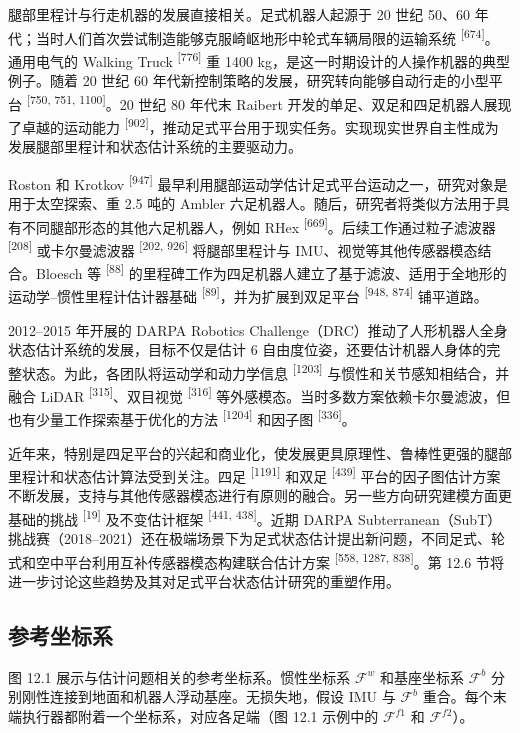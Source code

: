 腿部里程计与行走机器的发展直接相关。足式机器人起源于 20 世纪 50、60 年代；当时人们首次尝试制造能够克服崎岖地形中轮式车辆局限的运输系统 \textsuperscript{[674]}。通用电气的 Walking Truck \textsuperscript{[776]} 重 1400 kg，是这一时期设计的人操作机器的典型例子。随着 20 世纪 60 年代新控制策略的发展，研究转向能够自动行走的小型平台 \textsuperscript{[750, 751, 1100]}。20 世纪 80 年代末 Raibert 开发的单足、双足和四足机器人展现了卓越的运动能力 \textsuperscript{[902]}，推动足式平台用于现实任务。实现现实世界自主性成为发展腿部里程计和状态估计系统的主要驱动力。

Roston 和 Krotkov \textsuperscript{[947]} 最早利用腿部运动学估计足式平台运动之一，研究对象是用于太空探索、重 2.5 吨的 Ambler 六足机器人。随后，研究者将类似方法用于具有不同腿部形态的其他六足机器人，例如 RHex \textsuperscript{[669]}。后续工作通过粒子滤波器 \textsuperscript{[208]} 或卡尔曼滤波器 \textsuperscript{[202, 926]} 将腿部里程计与 IMU、视觉等其他传感器模态结合。Bloesch 等 \textsuperscript{[88]} 的里程碑工作为四足机器人建立了基于滤波、适用于全地形的运动学--惯性里程计估计器基础 \textsuperscript{[89]}，并为扩展到双足平台 \textsuperscript{[948, 874]} 铺平道路。

2012--2015 年开展的 DARPA Robotics Challenge（DRC）推动了人形机器人全身状态估计系统的发展，目标不仅是估计 6 自由度位姿，还要估计机器人身体的完整状态。为此，各团队将运动学和动力学信息 \textsuperscript{[1203]} 与惯性和关节感知相结合，并融合 LiDAR \textsuperscript{[315]}、双目视觉 \textsuperscript{[316]} 等外感模态。当时多数方案依赖卡尔曼滤波，但也有少量工作探索基于优化的方法 \textsuperscript{[1204]} 和因子图 \textsuperscript{[336]}。

近年来，特别是四足平台的兴起和商业化，使发展更具原理性、鲁棒性更强的腿部里程计和状态估计算法受到关注。四足 \textsuperscript{[1191]} 和双足 \textsuperscript{[439]} 平台的因子图估计方案不断发展，支持与其他传感器模态进行有原则的融合。另一些方向研究建模方面更基础的挑战 \textsuperscript{[19]} 及不变估计框架 \textsuperscript{[441, 438]}。近期 DARPA Subterranean（SubT）挑战赛（2018--2021）还在极端场景下为足式状态估计提出新问题，不同足式、轮式和空中平台利用互补传感器模态构建联合估计方案 \textsuperscript{[558, 1287, 838]}。第 12.6 节将进一步讨论这些趋势及其对足式平台状态估计研究的重塑作用。

\subsection{参考坐标系}

图 12.1 展示与估计问题相关的参考坐标系。惯性坐标系 $\mathcal{F}^w$ 和基座坐标系 $\mathcal{F}^b$ 分别刚性连接到地面和机器人浮动基座。无损失地，假设 IMU 与 $\mathcal{F}^b$ 重合。每个末端执行器都附着一个坐标系，对应各足端（图 12.1 示例中的 $\mathcal{F}^{f1}$ 和 $\mathcal{F}^{f2}$）。

